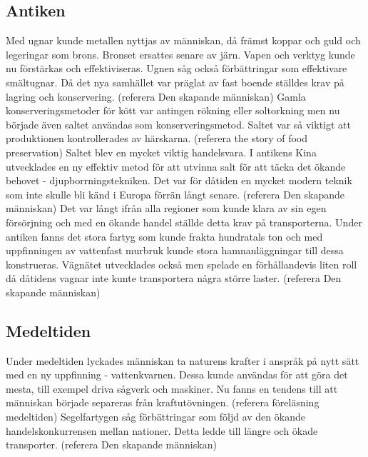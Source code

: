 \subsection{Antiken}
Med ugnar kunde metallen nyttjas av människan, då främst koppar och guld och legeringar som brons. Bronset ersattes senare av järn. Vapen och verktyg kunde nu förstärkas och effektiviseras. Ugnen såg också förbättringar som effektivare smältugnar. 
\newline
\newline 
Då det nya samhället var präglat av fast boende ställdes krav på lagring och konservering. (referera Den skapande människan) 
\newline
\newline
Gamla konserveringsmetoder för kött var antingen rökning eller soltorkning men nu började även saltet användas som konserveringsmetod. Saltet var så viktigt att produktionen kontrollerades av härskarna. 
(referera the story of food preservation) 
\newline
\newline
Saltet blev en mycket viktig handelsvara. I antikens Kina utvecklades en ny effektiv metod för att utvinna salt för att täcka det ökande behovet - djupborrningstekniken. Det var för dåtiden en mycket modern teknik som inte skulle bli känd i Europa förrän långt senare. (referera Den skapande människan)
\newline
\newline
Det var långt ifrån alla regioner som kunde klara av sin egen försörjning och med en ökande handel ställde detta krav på transporterna. Under antiken fanns det stora fartyg som kunde frakta hundratals ton och med uppfinningen av vattenfast murbruk kunde stora hamnanläggningar till dessa konstrueras. Vägnätet utvecklades också men spelade en förhållandevis liten roll då dåtidens vagnar inte kunte transportera några större laster. (referera Den skapande människan)

\subsection{Medeltiden}    
Under medeltiden lyckades människan ta naturens krafter i anspråk på nytt sätt med en ny uppfinning - vattenkvarnen. Dessa kunde användas för att göra det mesta, till exempel driva sågverk och maskiner. Nu fanns en tendens till att människan började separeras från kraftutövningen. (referera föreläsning medeltiden) 
\newline
\newline
Segelfartygen såg förbättringar som följd av den ökande handelskonkurrensen mellan nationer. Detta ledde till längre och ökade transporter. (referera Den skapande människan)

